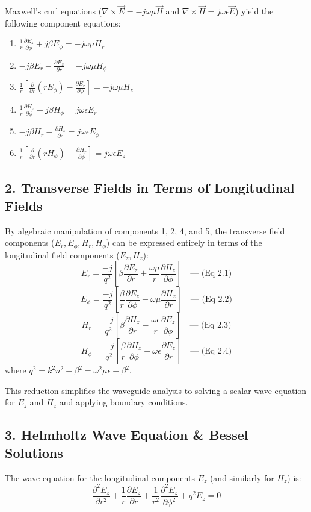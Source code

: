 Maxwell's curl equations ($\nabla \times \vec{E} = -j\omega\mu\vec{H}$ and $\nabla \times \vec{H} = j\omega\epsilon\vec{E}$) yield the following component equations:
\begin{enumerate}
  \item $\frac{1}{r}\frac{\partial E_z}{\partial \phi} + j\beta E_\phi = -j\omega\mu H_r$
  \item $-j\beta E_r - \frac{\partial E_z}{\partial r} = -j\omega\mu H_\phi$
  \item $\frac{1}{r}\left[\frac{\partial}{\partial r}(r E_\phi) - \frac{\partial E_r}{\partial \phi}\right] = -j\omega\mu H_z$
  \item $\frac{1}{r}\frac{\partial H_z}{\partial \phi} + j\beta H_\phi = j\omega\epsilon E_r$
  \item $-j\beta H_r - \frac{\partial H_z}{\partial r} = j\omega\epsilon E_\phi$
  \item $\frac{1}{r}\left[\frac{\partial}{\partial r}(r H_\phi) - \frac{\partial H_r}{\partial \phi}\right] = j\omega\epsilon E_z$
\end{enumerate}


\subsection{2. Transverse Fields in Terms of Longitudinal Fields}
By algebraic manipulation of components 1, 2, 4, and 5, the transverse field components ($E_r, E_\phi, H_r, H_\phi$) can be expressed entirely in terms of the longitudinal field components ($E_z, H_z$):
\[ E_r = \frac{-j}{q^2} \left[ \beta \frac{\partial E_z}{\partial r} + \frac{\omega\mu}{r} \frac{\partial H_z}{\partial \phi} \right] \quad \text{--- (Eq 2.1)} \]
\[ E_\phi = \frac{-j}{q^2} \left[ \frac{\beta}{r} \frac{\partial E_z}{\partial \phi} - \omega\mu \frac{\partial H_z}{\partial r} \right] \quad \text{--- (Eq 2.2)} \]
\[ H_r = \frac{-j}{q^2} \left[ \beta \frac{\partial H_z}{\partial r} - \frac{\omega\epsilon}{r} \frac{\partial E_z}{\partial \phi} \right] \quad \text{--- (Eq 2.3)} \]
\[ H_\phi = \frac{-j}{q^2} \left[ \frac{\beta}{r} \frac{\partial H_z}{\partial \phi} + \omega\epsilon \frac{\partial E_z}{\partial r} \right] \quad \text{--- (Eq 2.4)} \]
where $q^2 = k^2 n^2 - \beta^2 = \omega^2\mu\epsilon - \beta^2$.

This reduction simplifies the waveguide analysis to solving a scalar wave equation for $E_z$ and $H_z$ and applying boundary conditions.


\subsection{3. Helmholtz Wave Equation \& Bessel Solutions}
The wave equation for the longitudinal components $E_z$ (and similarly for $H_z$) is:
\[ \frac{\partial^2 E_z}{\partial r^2} + \frac{1}{r}\frac{\partial E_z}{\partial r} + \frac{1}{r^2}\frac{\partial^2 E_z}{\partial \phi^2} + q^2 E_z = 0 \]

